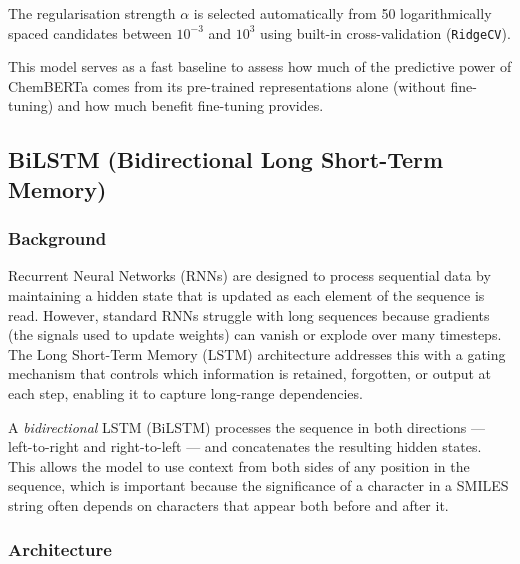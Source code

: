 \documentclass[11pt,a4paper]{article}
\begin{document}
The regularisation strength $\alpha$ is selected automatically from 50 logarithmically spaced candidates between $10^{-3}$ and $10^{3}$ using built-in cross-validation (\texttt{RidgeCV}).

This model serves as a fast baseline to assess how much of the predictive power of ChemBERTa comes from its pre-trained representations alone (without fine-tuning) and how much benefit fine-tuning provides.

\subsection{BiLSTM (Bidirectional Long Short-Term Memory)}

\subsubsection*{Background}

Recurrent Neural Networks (RNNs) are designed to process sequential data by maintaining a hidden state that is updated as each element of the sequence is read. However, standard RNNs struggle with long sequences because gradients (the signals used to update weights) can vanish or explode over many timesteps. The Long Short-Term Memory (LSTM) architecture addresses this with a gating mechanism that controls which information is retained, forgotten, or output at each step, enabling it to capture long-range dependencies.

A \emph{bidirectional} LSTM (BiLSTM) processes the sequence in both directions --- left-to-right and right-to-left --- and concatenates the resulting hidden states. This allows the model to use context from both sides of any position in the sequence, which is important because the significance of a character in a SMILES string often depends on characters that appear both before and after it.

\subsubsection*{Architecture}
\end{document}
